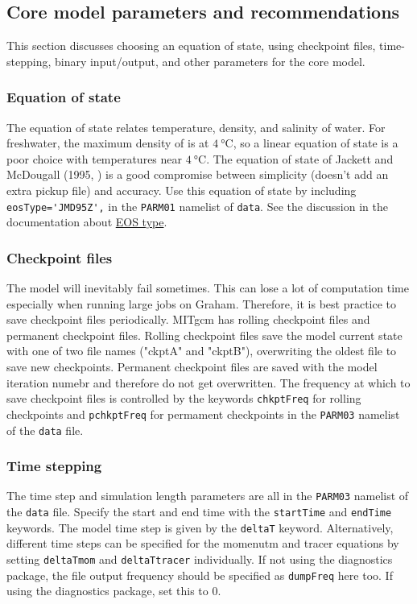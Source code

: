 \documentclass[11pt]{article}
\begin{document}
\subsection{Core model parameters and recommendations}
This section discusses choosing an equation of state, using checkpoint files, time-stepping, binary input/output, and other parameters for the core model.

\subsubsection{Equation of state}
The equation of state relates temperature, density, and salinity of water. For freshwater, the maximum density of is at $\SI{4}{\celsius}$, so a linear equation of state is a poor choice with temperatures near $\SI{4}{\celsius}$. The equation of state of Jackett and McDougall (1995, \cite{JackettMcDougall995}) is a good compromise between simplicity (doesn't add an extra pickup file) and accuracy. Use this equation of state by including \verb|eosType='JMD95Z',| in the \verb|PARM01| namelist of \verb|data|. See the discussion in the documentation about \href{https://mitgcm.readthedocs.io/en/latest/getting_started/getting_started.html#parameters-equation-of-state}{EOS type}.

\subsubsection{Checkpoint files}
The model will inevitably fail sometimes. This can lose a lot of computation time especially when running large jobs on Graham. Therefore, it is best practice to save checkpoint files periodically. MITgcm has rolling checkpoint files and permanent checkpoint files. Rolling checkpoint files save the model current state with one of two file names ("ckptA" and "ckptB"), overwriting the oldest file to save new checkpoints. Permanent checkpoint files are saved with the model iteration numebr and therefore do not get overwritten. The frequency at which to save checkpoint files is controlled by the keywords \verb|chkptFreq| for rolling checkpoints and \verb|pchkptFreq| for permament checkpoints in the \verb|PARM03| namelist of the \verb|data| file.

\subsubsection{Time stepping}
The time step and simulation length parameters are all in the \verb|PARM03| namelist of the \verb|data| file. Specify the start and end time with the \verb|startTime| and \verb|endTime| keywords. The model time step is given by the \verb|deltaT| keyword. Alternatively, different time steps can be specified for the momenutm and tracer equations by setting \verb|deltaTmom| and \verb|deltaTtracer| individually. If not using the diagnostics package, the file output frequency should be specified as \verb|dumpFreq| here too. If using the diagnostics package, set this to 0.
\end{document}
